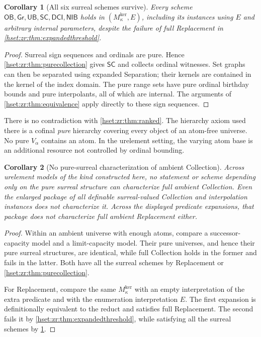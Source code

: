 \documentclass[11pt,letterpaper]{article}
\newtheorem{corollary}[corollary]{Corollary}\aliascntresetthe{corollary}
\theoremstyle{definition}
\theoremstyle{remark}
\newcommand{\OB}{\mathsf{OB}}
\newcommand{\Gr}{\mathsf{Gr}}
\newcommand{\UB}{\mathsf{UB}}
\newcommand{\SC}{\mathsf{SC}}
\newcommand{\DCI}{\mathsf{DCI}}
\newcommand{\NIB}{\mathsf{NIB}}
\newcommand{\Mker}{M^{\mathrm{ker}}}
\begin{document}
\begin{corollary}[All six surreal schemes survive]
\label{hset:zr:cor:surrealsurvive}
Every scheme $\OB,\Gr,\UB,\SC,\DCI,\NIB$ holds in $(\Mker_\kappa,E)$, including its instances using $E$ and arbitrary internal parameters, despite the failure of full Replacement in \cref{hset:zr:thm:expandedthreshold}.
\end{corollary}
\begin{proof}
Surreal sign sequences and ordinals are pure. Hence \cref{hset:zr:thm:purecollection} gives $\SC$ and collects ordinal witnesses. Set graphs can then be separated using expanded Separation; their kernels are contained in the kernel of the index domain. The pure range sets have pure ordinal birthday bounds and pure interpolants, all of which are internal. The arguments of \cref{hset:zr:thm:equivalence} apply directly to these sign sequences.
\end{proof}

There is no contradiction with \cref{hset:zr:thm:ranked}. The hierarchy axiom used there is a cofinal \emph{pure} hierarchy covering every object of an atom-free universe. No pure $V_\alpha$ contains an atom. In the urelement setting, the varying atom base is an additional resource not controlled by ordinal bounding.

\begin{corollary}[No pure-surreal characterization of ambient Collection]
\label{hset:zr:cor:nogo}
Across urelement models of the kind constructed here, no statement or scheme depending only on the pure surreal structure can characterize full ambient Collection. Even the enlarged package of all definable surreal-valued Collection and interpolation instances does not characterize it. Across the displayed predicate expansions, that package does not characterize full ambient Replacement either.
\end{corollary}
\begin{proof}
Within an ambient universe with enough atoms, compare a successor-capacity model and a limit-capacity model. Their pure universes, and hence their pure surreal structures, are identical, while full Collection holds in the former and fails in the latter. Both have all the surreal schemes by Replacement or \cref{hset:zr:thm:purecollection}.

For Replacement, compare the same $\Mker_\kappa$ with an empty interpretation of the extra predicate and with the enumeration interpretation $E$. The first expansion is definitionally equivalent to the reduct and satisfies full Replacement. The second fails it by \cref{hset:zr:thm:expandedthreshold}, while satisfying all the surreal schemes by \cref{hset:zr:cor:surrealsurvive}.
\end{proof}
\end{document}
